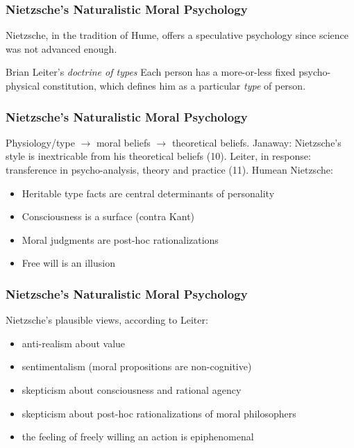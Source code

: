 \documentclass[xcolor=dvipsnames]{beamer}
\begin{document}
\begin{frame}
  \frametitle{Nietzsche's Naturalistic Moral Psychology}
Nietzsche, in the tradition of Hume, offers a speculative psychology
since science was not advanced enough.
  \begin{block}{  Brian Leiter's \emph{doctrine of types}}
    Each person has a more-or-less fixed psycho-physical constitution,
    which defines him as a particular \emph{type} of person.
  \end{block}
\end{frame}

\begin{frame}
  \frametitle{Nietzsche's Naturalistic Moral Psychology}
  Physiology/type $\longrightarrow$ moral beliefs $\longrightarrow$
  theoretical beliefs. Janaway: Nietzsche's style is inextricable from
  his theoretical beliefs (10). Leiter, in response: transference in
  psycho-analysis, theory and practice (11). Humean Nietzsche:
  \begin{itemize}
  \item Heritable type facts are central determinants of personality
  \item Consciousness is a surface (contra Kant)
  \item Moral judgments are post-hoc rationalizations
  \item Free will is an illusion
  \end{itemize}
\end{frame}

\begin{frame}
  \frametitle{Nietzsche's Naturalistic Moral Psychology}
  Nietzsche's plausible views, according to Leiter:
  \begin{itemize}
  \item anti-realism about value
  \item sentimentalism (moral propositions are non-cognitive)
  \item skepticism about consciousness and rational agency
  \item skepticism about post-hoc rationalizations of moral
    philosophers
  \item the feeling of freely willing an action is epiphenomenal
  \end{itemize}
\end{frame}
\end{document}
